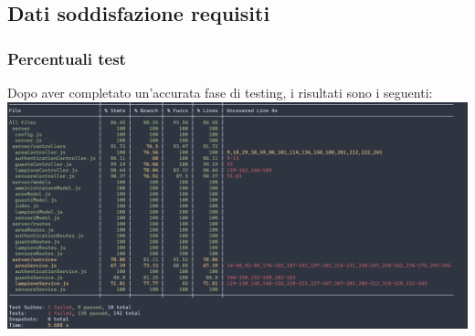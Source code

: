 \documentclass[12pt]{article}
\begin{document}
\subsection{Dati soddisfazione requisiti}
	\subsubsection{Percentuali test}
	Dopo aver completato un'accurata fase di testing, i risultati sono i seguenti:
	\\
	\includegraphics[width=450pt]{percentuali_test.png}
\end{document}
